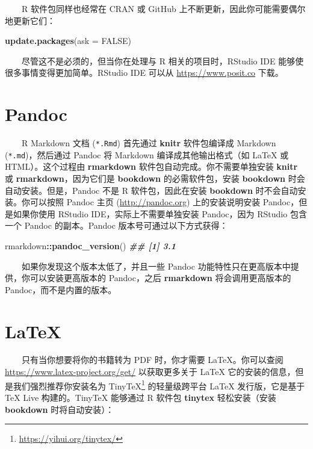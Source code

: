 \documentclass[
  12pt,
]{krantz}
\newenvironment{Shaded}{\begin{snugshade}}{\end{snugshade}}
\newcommand{\AttributeTok}[1]{\textcolor[rgb]{0.13,0.29,0.53}{#1}}
\newcommand{\ConstantTok}[1]{\textcolor[rgb]{0.56,0.35,0.01}{#1}}
\newcommand{\DocumentationTok}[1]{\textcolor[rgb]{0.56,0.35,0.01}{\textbf{\textit{#1}}}}
\newcommand{\FunctionTok}[1]{\textcolor[rgb]{0.13,0.29,0.53}{\textbf{#1}}}
\newcommand{\NormalTok}[1]{#1}
\newcommand{\SpecialCharTok}[1]{\textcolor[rgb]{0.81,0.36,0.00}{\textbf{#1}}}
\renewcommand{\href}[2]{#2\footnote{\url{#1}}}
\theoremstyle{definition}
\theoremstyle{definition}
\theoremstyle{definition}
\theoremstyle{definition}
\theoremstyle{remark}
\begin{document}
  R 软件包同样也经常在 CRAN 或 GitHub 上不断更新，因此你可能需要偶尔地更新它们：

\begin{Shaded}
\begin{Highlighting}[]
\FunctionTok{update.packages}\NormalTok{(}\AttributeTok{ask =} \ConstantTok{FALSE}\NormalTok{)}
\end{Highlighting}
\end{Shaded}

  尽管这不是必须的，但当你在处理与 R 相关的项目时，RStudio IDE 能够使很多事情变得更加简单。RStudio IDE 可以从 \url{https://www.posit.co} 下载。

\hypertarget{pandoc}{%
\section{Pandoc}\label{pandoc}}

  R Markdown 文档 (\texttt{*.Rmd}) 首先通过 \textbf{knitr} 软件包编译成 Markdown (\texttt{*.md})，然后通过 Pandoc 将 Markdown 编译成其他输出格式（如 LaTeX 或 HTML）。这个过程由 \textbf{rmarkdown} 软件包自动完成。你不需要单独安装 \textbf{knitr} 或 \textbf{rmarkdown}，因为它们是 \textbf{bookdown} 的必需软件包，安装 \textbf{bookdown} 时会自动安装。但是，Pandoc 不是 R 软件包，因此在安装 \textbf{bookdown} 时不会自动安装。你可以按照 Pandoc 主页 (\url{http://pandoc.org}) 上的安装说明安装 Pandoc，但是如果你使用 RStudio IDE，实际上不需要单独安装 Pandoc，因为 RStudio 包含一个 Pandoc 的副本。Pandoc 版本号可通过以下方式获得：

\begin{Shaded}
\begin{Highlighting}[]
\NormalTok{rmarkdown}\SpecialCharTok{::}\FunctionTok{pandoc\_version}\NormalTok{()}
\DocumentationTok{\#\# [1] \textquotesingle{}3.1\textquotesingle{}}
\end{Highlighting}
\end{Shaded}

  如果你发现这个版本太低了，并且一些 Pandoc 功能特性只在更高版本中提供，你可以安装更高版本的 Pandoc，之后 \textbf{rmarkdown} 将会调用更高版本的 Pandoc，而不是内置的版本。

\hypertarget{latex}{%
\section{LaTeX}\label{latex}}

  只有当你想要将你的书籍转为 PDF 时，你才需要 LaTeX。你可以查阅 \url{https://www.latex-project.org/get/} 以获取更多关于 LaTeX 它的安装的信息，但是我们强烈推荐你安装名为 \href{https://yihui.org/tinytex/}{TinyTeX} 的轻量级跨平台 LaTeX 发行版，它是基于 TeX Live 构建的。TinyTeX 能够通过 R 软件包 \textbf{tinytex} 轻松安装（安装 \textbf{bookdown} 时将自动安装）：
\end{document}
